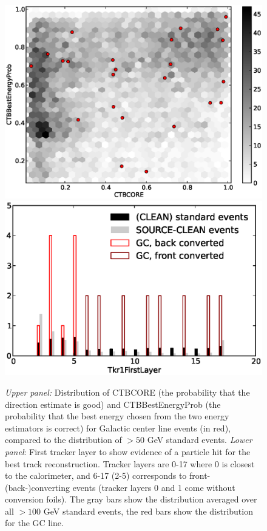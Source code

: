 \documentclass[aps,twocolumn,prd,superscriptaddress,showpacs,nofootinbib,fixfloat]{revtex4}
\begin{document}
\begin{figure}
  \centering
  \includegraphics[width=1.00\linewidth]{plots/CTBCORE_CTBBestEnergyProb.eps}
  \includegraphics[width=1.00\linewidth]{plots/Tkr1FirstLayer.eps}
  \caption{\emph{Upper panel:} Distribution of CTBCORE (the
  probability that the direction estimate is good) and
  CTBBestEnergyProb (the probability that the best energy
  chosen from the two energy estimators is correct) for
  Galactic center line events (in red), compared to the
  distribution of $>50$ GeV standard events.  \emph{Lower
  panel}: First tracker layer to show evidence of a particle
  hit for the best track reconstruction. Tracker layers are
  0-17 where 0 is closest to the calorimeter, and 6-17 (2-5)
  corresponds to front- (back-)converting events (tracker
  layers 0 and 1 come without conversion foils). The gray
  bars show the distribution averaged over all $>100$ GeV
  standard events, the red bars show the distribution
  for the GC line.}
  \label{fig:CTBquality}
\end{figure}
\end{document}
